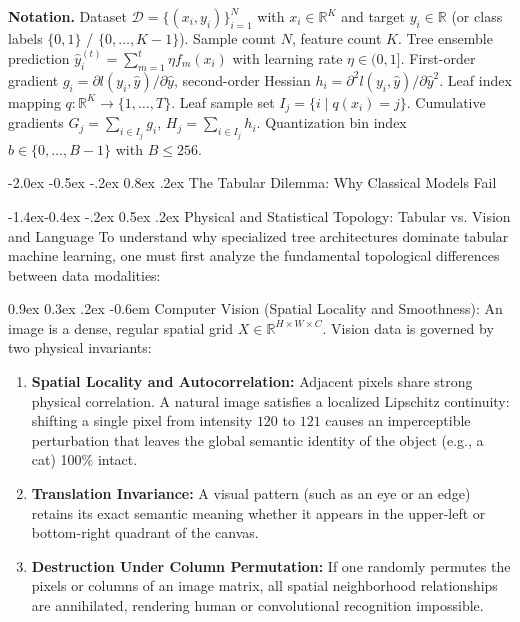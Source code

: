 \documentclass[11pt,a4paper]{article}
\makeatletter
\renewcommand\section{\@startsection {section}{1}{\z@}%
                                   {-2.0ex \@plus -0.5ex \@minus -.2ex}%
                                   {0.8ex \@plus.2ex}%
                                   {\normalfont\large\bfseries}}
\renewcommand\subsection{\@startsection{subsection}{2}{\z@}%
                                     {-1.4ex\@plus -0.4ex \@minus -.2ex}%
                                     {0.5ex \@plus .2ex}%
                                     {\normalfont\normalsize\bfseries}}
\renewcommand\paragraph{\@startsection{paragraph}{4}{\z@}%
                                     {0.9ex \@plus0.3ex \@minus.2ex}%
                                     {-0.6em}%
                                     {\normalfont\normalsize\bfseries}}
\newcommand{\R}{\mathbb{R}}
\makeatother
\begin{document}
\vspace{0.8em}
\noindent\textbf{Notation.} Dataset $\mathcal{D} = \{(x_i, y_i)\}_{i=1}^N$ with $x_i \in \R^K$ and target $y_i \in \R$ (or class labels $\{0, 1\}$ / $\{0, \dots, K-1\}$). Sample count $N$, feature count $K$. Tree ensemble prediction $\hat{y}_i^{(t)} = \sum_{m=1}^t \eta f_m(x_i)$ with learning rate $\eta \in (0, 1]$. First-order gradient $g_i = \partial l(y_i, \hat{y}) / \partial \hat{y}$, second-order Hessian $h_i = \partial^2 l(y_i, \hat{y}) / \partial \hat{y}^2$. Leaf index mapping $q: \R^K \to \{1, \dots, T\}$. Leaf sample set $I_j = \{i \mid q(x_i) = j\}$. Cumulative gradients $G_j = \sum_{i \in I_j} g_i$, $H_j = \sum_{i \in I_j} h_i$. Quantization bin index $b \in \{0, \dots, B-1\}$ with $B \le 256$.

\newpage
\tableofcontents
\newpage

\section{The Tabular Dilemma: Why Classical Models Fail}

\subsection{Physical and Statistical Topology: Tabular vs. Vision and Language}
To understand why specialized tree architectures dominate tabular machine learning, one must first analyze the fundamental topological differences between data modalities:

\paragraph{Computer Vision (Spatial Locality and Smoothness):} 
An image is a dense, regular spatial grid $X \in \R^{H \times W \times C}$. Vision data is governed by two physical invariants:
\begin{enumerate}
    \item \textbf{Spatial Locality and Autocorrelation:} Adjacent pixels share strong physical correlation. A natural image satisfies a localized Lipschitz continuity: shifting a single pixel from intensity $120$ to $121$ causes an imperceptible perturbation that leaves the global semantic identity of the object (e.g., a cat) 100\% intact.
    \item \textbf{Translation Invariance:} A visual pattern (such as an eye or an edge) retains its exact semantic meaning whether it appears in the upper-left or bottom-right quadrant of the canvas.
    \item \textbf{Destruction Under Column Permutation:} If one randomly permutes the pixels or columns of an image matrix, all spatial neighborhood relationships are annihilated, rendering human or convolutional recognition impossible.
\end{enumerate}
\end{document}
